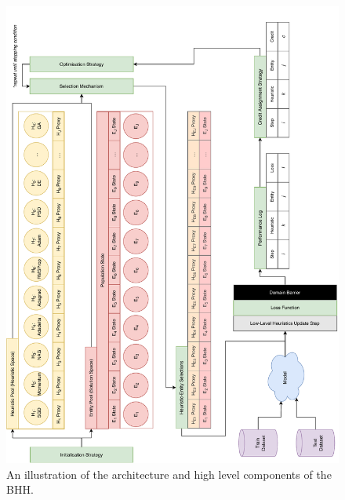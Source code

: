 \documentclass[preprint,review,12pt]{elsarticle}
\begin{document}
\begin{figure}[htbp]
	\centering
	\includegraphics[width=1.0\textwidth]{bhh_architecture.pdf}
	\caption[An illustration of
		the architecture and high level components of the \acf{BHH}.]{An illustration of
		the architecture and high level components of the \acf{BHH}.}
	\label{fig:bhh_architecture}
\end{figure}
\end{document}
